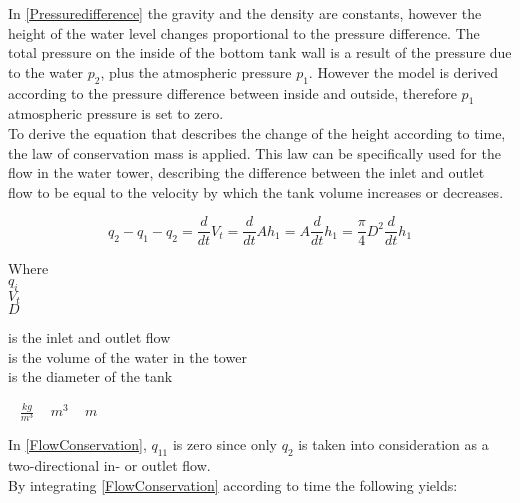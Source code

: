 In \eqref{Pressuredifference} the gravity and the density are constants, however the height of the water level changes proportional to the pressure difference. The total pressure on the inside of the bottom tank wall is a result of the pressure due to the water $p_2$, plus the
atmospheric pressure $p_1$. However the model is derived according to the pressure difference between inside and outside, therefore $p_1$ atmospheric pressure is set to zero. 
\\
To derive the equation that describes the change of the height according to 
time, the law of conservation mass is applied. This law can be specifically used for the flow in the water tower, describing the difference between the inlet and outlet flow to be equal to the velocity by which the tank volume increases or decreases. 

\begin{equation}
  q_{2} - q_{1} - q_2 = \frac{d}{dt}V_t = \frac{d}{dt}Ah_1 = A \frac{d}{dt}h_1 = \frac{\pi}{4} D^2 \frac{d}{dt} h_1
  \label{FlowConservation}
\end{equation}

\begin{minipage}[t]{0.20\textwidth}
Where\\
\hspace*{8mm} $q_i$ \\
\hspace*{8mm} $V_t$ \\
\hspace*{8mm} $D$ 
\end{minipage}
\begin{minipage}[t]{0.68\textwidth}
\vspace*{2mm}
is the inlet and outlet flow\\
is the volume of the water in the tower\\
is the diameter of the tank 
\end{minipage}
\begin{minipage}[t]{0.10\textwidth}
\vspace*{2mm}
\textcolor{White}{te}$\unit{\frac{kg}{m^3}}$
\textcolor{White}{te}$\unit{m^3}$
\textcolor{White}{te}$\unit{m}$
\end{minipage}

In \eqref{FlowConservation}, $q_11$ is zero since only $q_2$ is taken into consideration as a two-directional in- or outlet flow. 
\\
By integrating \eqref{FlowConservation} according to time the following yields:

